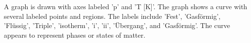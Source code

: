 A graph is drawn with axes labeled 'p' and 'T [K]'. The graph shows a curve with several labeled points and regions. The labels include 'Fest', 'Gasförmig', 'Flüssig', 'Triple', 'isotherm', 'i', 'ii', 'Übergang', and 'Gasförmig'. The curve appears to represent phases or states of matter.